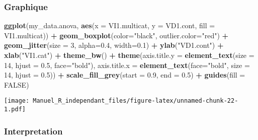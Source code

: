 \documentclass[
]{book}
\newenvironment{Shaded}{\begin{snugshade}}{\end{snugshade}}
\newcommand{\DataTypeTok}[1]{\textcolor[rgb]{0.13,0.29,0.53}{#1}}
\newcommand{\DecValTok}[1]{\textcolor[rgb]{0.00,0.00,0.81}{#1}}
\newcommand{\FloatTok}[1]{\textcolor[rgb]{0.00,0.00,0.81}{#1}}
\newcommand{\KeywordTok}[1]{\textcolor[rgb]{0.13,0.29,0.53}{\textbf{#1}}}
\newcommand{\NormalTok}[1]{#1}
\newcommand{\OperatorTok}[1]{\textcolor[rgb]{0.81,0.36,0.00}{\textbf{#1}}}
\newcommand{\OtherTok}[1]{\textcolor[rgb]{0.56,0.35,0.01}{#1}}
\newcommand{\StringTok}[1]{\textcolor[rgb]{0.31,0.60,0.02}{#1}}
\begin{document}
\hypertarget{graphique-1}{%
\subsubsection{Graphique}\label{graphique-1}}

\begin{Shaded}
\begin{Highlighting}[]
\KeywordTok{ggplot}\NormalTok{(my_data.anova, }\KeywordTok{aes}\NormalTok{(}\DataTypeTok{x =}\NormalTok{ VI1.multicat, }\DataTypeTok{y =}\NormalTok{ VD1.cont, }\DataTypeTok{fill =}\NormalTok{ VI1.multicat)) }\OperatorTok{+}
\StringTok{  }\KeywordTok{geom_boxplot}\NormalTok{(}\DataTypeTok{color=}\StringTok{"black"}\NormalTok{, }\DataTypeTok{outlier.color=}\StringTok{"red"}\NormalTok{) }\OperatorTok{+}\StringTok{ }
\StringTok{  }\KeywordTok{geom_jitter}\NormalTok{(}\DataTypeTok{size =} \DecValTok{3}\NormalTok{, }\DataTypeTok{alpha=}\FloatTok{0.4}\NormalTok{, }\DataTypeTok{width=}\FloatTok{0.1}\NormalTok{) }\OperatorTok{+}\StringTok{ }
\StringTok{  }\KeywordTok{ylab}\NormalTok{(}\StringTok{"VD1.cont"}\NormalTok{) }\OperatorTok{+}\StringTok{ }\KeywordTok{xlab}\NormalTok{(}\StringTok{"VI1.cat"}\NormalTok{) }\OperatorTok{+}\StringTok{ }
\StringTok{  }\KeywordTok{theme_bw}\NormalTok{() }\OperatorTok{+}\StringTok{ }
\StringTok{  }\KeywordTok{theme}\NormalTok{(}\DataTypeTok{axis.title.y =} \KeywordTok{element_text}\NormalTok{(}\DataTypeTok{size =} \DecValTok{14}\NormalTok{, }\DataTypeTok{hjust =} \FloatTok{0.5}\NormalTok{, }\DataTypeTok{face=}\StringTok{"bold"}\NormalTok{), }
        \DataTypeTok{axis.title.x =} \KeywordTok{element_text}\NormalTok{(}\DataTypeTok{face=}\StringTok{"bold"}\NormalTok{, }\DataTypeTok{size =} \DecValTok{14}\NormalTok{, }\DataTypeTok{hjust =} \FloatTok{0.5}\NormalTok{)) }\OperatorTok{+}
\StringTok{  }\KeywordTok{scale_fill_grey}\NormalTok{(}\DataTypeTok{start =} \FloatTok{0.9}\NormalTok{, }\DataTypeTok{end =} \FloatTok{0.5}\NormalTok{) }\OperatorTok{+}
\StringTok{  }\KeywordTok{guides}\NormalTok{(}\DataTypeTok{fill =} \OtherTok{FALSE}\NormalTok{)}
\end{Highlighting}
\end{Shaded}

\texttt{[image: Manuel\_R\_independant\_files/figure-latex/unnamed-chunk-22-1.pdf]}

\hypertarget{interpretation-1}{%
\subsubsection{Interpretation}\label{interpretation-1}}
\end{document}
